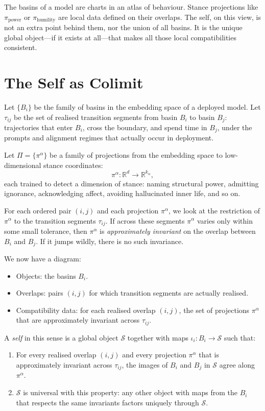 \documentclass[12pt,a4paper]{article}
\begin{document}
The basins of a model are charts in an atlas of behaviour. Stance projections like $\pi_{\mathrm{power}}$ or $\pi_{\mathrm{humility}}$ are local data defined on their overlaps. The self, on this view, is not an extra point behind them, nor the union of all basins. It is the unique global object---if it exists at all---that makes all those local compatibilities consistent.

\section{The Self as Colimit}

Let $\{B_i\}$ be the family of basins in the embedding space of a deployed model. Let $\tau_{ij}$ be the set of realised transition segments from basin $B_i$ to basin $B_j$: trajectories that enter $B_i$, cross the boundary, and spend time in $B_j$, under the prompts and alignment regimes that actually occur in deployment.

Let $\Pi = \{\pi^\alpha\}$ be a family of projections from the embedding space to low-dimensional stance coordinates:
\[
\pi^\alpha : \mathbb{R}^d \longrightarrow \mathbb{R}^{k_\alpha},
\]
each trained to detect a dimension of stance: naming structural power, admitting ignorance, acknowledging affect, avoiding hallucinated inner life, and so on.

For each ordered pair $(i,j)$ and each projection $\pi^\alpha$, we look at the restriction of $\pi^\alpha$ to the transition segments $\tau_{ij}$. If across these segments $\pi^\alpha$ varies only within some small tolerance, then $\pi^\alpha$ is \emph{approximately invariant} on the overlap between $B_i$ and $B_j$. If it jumps wildly, there is no such invariance.

We now have a diagram:

\begin{itemize}
  \item Objects: the basins $B_i$.
  \item Overlaps: pairs $(i,j)$ for which transition segments are actually realised.
  \item Compatibility data: for each realised overlap $(i,j)$, the set of projections $\pi^\alpha$ that are approximately invariant across $\tau_{ij}$.
\end{itemize}

A \emph{self} in this sense is a global object $\mathcal{S}$ together with maps $\iota_i : B_i \to \mathcal{S}$ such that:

\begin{enumerate}
  \item For every realised overlap $(i,j)$ and every projection $\pi^\alpha$ that is approximately invariant across $\tau_{ij}$, the images of $B_i$ and $B_j$ in $\mathcal{S}$ agree along $\pi^\alpha$.
  \item $\mathcal{S}$ is universal with this property: any other object with maps from the $B_i$ that respects the same invariants factors uniquely through $\mathcal{S}$.
\end{enumerate}
\end{document}
